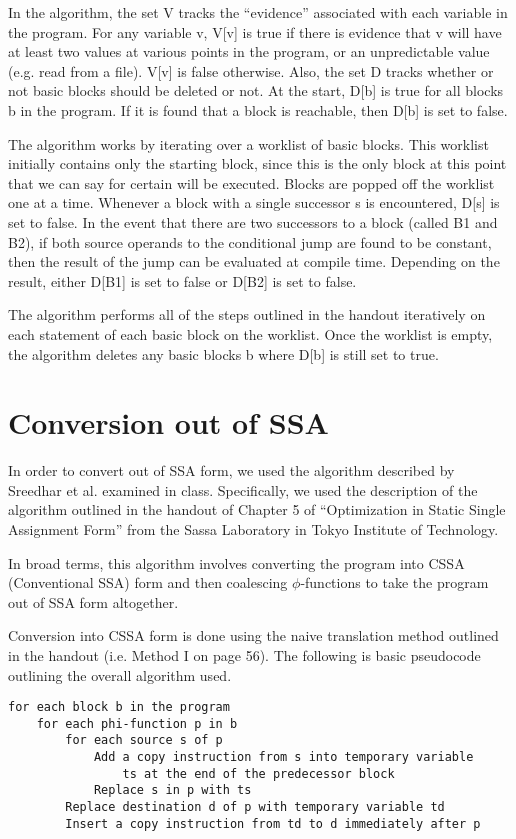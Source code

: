\documentclass[a4paper,10pt]{report}
\begin{document}
In the algorithm, the set V tracks the ``evidence'' associated with each variable in the program. For any variable v,
V[v] is true if there is evidence that v will have at least two values at various points in the program, or an unpredictable
value (e.g. read from a file). V[v] is false otherwise. Also, the set D tracks whether or not basic blocks should be deleted or 
not. At the start, D[b] is true for all blocks b in the program. If it is found that a block is reachable, then D[b] is set to false.

The algorithm works by iterating over a worklist of basic blocks. This worklist initially contains only the starting block,
since this is the only block at this point that we can say for certain will be executed. Blocks are popped off the worklist
one at a time. Whenever a block with a single successor s is encountered, D[s] is set to false. In the event that there are two
successors to a block (called B1 and B2), if both source operands to the conditional jump are found to be constant, then the result 
of the jump can be evaluated at compile time. Depending on the result, either D[B1] is set to false or D[B2] is set to false.

The algorithm performs all of the steps outlined in the handout iteratively on each statement of each basic block on the worklist.
Once the worklist is empty, the algorithm deletes any basic blocks b where D[b] is still set to true.

\section{Conversion out of SSA}
In order to convert out of SSA form, we used the algorithm described by Sreedhar et al. examined in class. Specifically, we used 
the description of the algorithm outlined in the handout of Chapter 5 of ``Optimization in Static Single Assignment Form'' from 
the Sassa Laboratory in Tokyo Institute of Technology.

In broad terms, this algorithm involves converting the program into CSSA (Conventional SSA) form and then
coalescing \(\phi\)-functions to take the program out of SSA form altogether.

Conversion into CSSA form is done using the naive translation method outlined in the handout (i.e. Method I on page 56).
The following is basic pseudocode outlining the overall algorithm used.

\begin{verbatim}
for each block b in the program
    for each phi-function p in b
        for each source s of p
            Add a copy instruction from s into temporary variable 
                ts at the end of the predecessor block
            Replace s in p with ts
        Replace destination d of p with temporary variable td
        Insert a copy instruction from td to d immediately after p
\end{verbatim}
\end{document}
